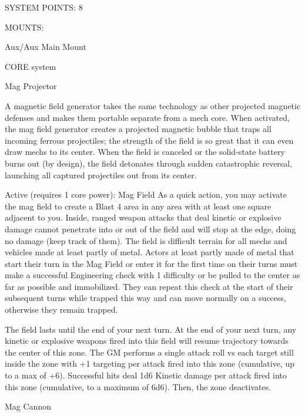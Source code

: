                                             SYSTEM POINTS: 8

                                                 MOUNTS:

 Aux/Aux                                             Main Mount

                                               CORE system




                                                     Mag Projector

 A magnetic field generator takes the same technology as other projected magnetic defenses and makes
  them portable separate from a mech core. When activated, the mag field generator creates a projected
 magnetic bubble that traps all incoming ferrous projectiles; the strength of the field is so great that it can
 even draw mechs to its center. When the field is canceled or the solid-state battery burns out (by
 design), the field detonates through sudden catastrophic reversal, launching all captured projectiles out
 from its center.

 Active (requires 1 core power): Mag Field
 As a quick action, you may activate the mag field to create a Blast 4 area in any area with at least one
  square adjacent to you. Inside, ranged weapon attacks that deal kinetic or explosive damage cannot
  penetrate into or out of the field and will stop at the edge, doing no damage (keep track of them). The
 field is difficult terrain for all mechs and vehicles made at least partly of metal. Actors at least partly
  made of metal that start their turn in the Mag Field or enter it for the first time on their turns must make
  a successful Engineering check with 1 difficulty or be pulled to the center as far as possible and
  immobilized. They can repeat this check at the start of their subsequent turns while trapped this way
  and can move normally on a success, otherwise they remain trapped.

 The field lasts until the end of your next turn. At the end of your next turn, any kinetic or explosive
 weapons fired into this field will resume trajectory towards the center of this zone. The GM performs a
  single attack roll vs each target still inside the zone with +1 targeting per attack fired into this zone
  (cumulative, up to a max of +6). Successful hits deal 1d6 Kinetic damage per attack fired into this zone
  (cumulative, to a maximum of 6d6). Then, the zone deactivates.

Mag Cannon

